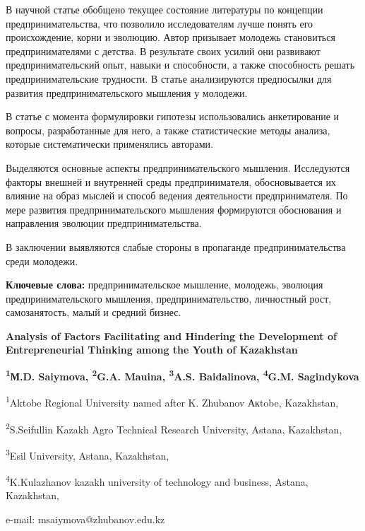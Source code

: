 В научной статье обобщено текущее состояние литературы по концепции
предпринимательства, что позволило исследователям лучше понять его
происхождение, корни и эволюцию. Автор призывает молодежь становиться
предпринимателями с детства. В результате своих усилий они развивают
предпринимательский опыт, навыки и способности, а также способность
решать предпринимательские трудности. В статье анализируются предпосылки
для развития предпринимательского мышления у молодежи.

В статье с момента формулировки гипотезы использовались анкетирование и
вопросы, разработанные для него, а также статистические методы анализа,
которые систематически применялись авторами.

Выделяются основные аспекты предпринимательского мышления. Исследуются
факторы внешней и внутренней среды предпринимателя, обосновывается их
влияние на образ мыслей и способ ведения деятельности предпринимателя.
По мере развития предпринимательского мышления формируются обоснования и
направления эволюции предпринимательства.

В заключении выявляются слабые стороны в пропаганде предпринимательства
среди молодежи.

{\bfseries Ключевые слова:} предпринимательское мышление, молодежь,
эволюция предпринимательского мышления, предпринимательство, личностный
рост, самозанятость, малый и средний бизнес.

{\bfseries Analysis of Factors Facilitating and Hindering the Development
of Entrepreneurial Thinking among the Youth of Kazakhstan}

{\bfseries \textsuperscript{1}М.D. Saiymova, \textsuperscript{\envelope }
\textsuperscript{2}G.A. Mauina, \textsuperscript{3}A.S. Baidalinova,
\textsuperscript{4}G.M. Sagindykova}

\textsuperscript{1}Aktobe Regional University named after K. Zhubanov
Акtobe, Kazakhstan,

\textsuperscript{2}S.Seifullin Kazakh Agro Technical Research
University, Astana, Kazakhstan,

\textsuperscript{3}Esil University, Astana, Kazakhstan,

\textsuperscript{4}K.Kulazhanov kazakh university of technology and
business, Astana, Kazakhstan,

e-mail: msaiymova@zhubanov.edu.kz


